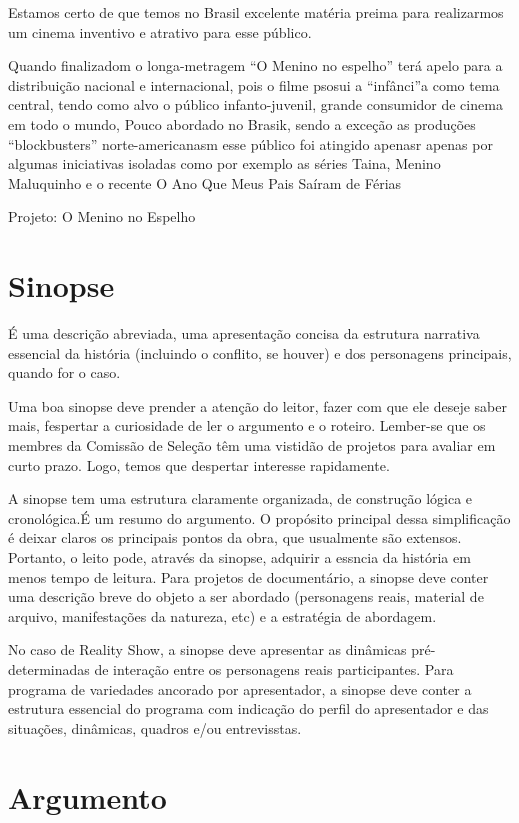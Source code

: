Estamos certo de que temos no Brasil excelente matéria preima para realizarmos um cinema inventivo e atrativo para esse público.

Quando finalizadom o longa-metragem “O Menino no espelho” terá apelo para a distribuição nacional e internacional, pois o filme psosui a “infânci”a como tema central,  tendo como alvo o público infanto-juvenil, grande consumidor de cinema em todo o mundo, Pouco abordado no Brasik, sendo a exceção as produções “blockbusters” norte-americanasm esse público foi atingido apenasr apenas   por algumas iniciativas isoladas como por exemplo as séries Taina, Menino Maluquinho e o recente O Ano Que Meus Pais Saíram de Férias

Projeto: O Menino no Espelho

\section{Sinopse}

É uma descrição abreviada, uma apresentação concisa da estrutura narrativa essencial da história (incluindo o conflito, se houver) e dos personagens principais, quando for o caso. 

Uma boa sinopse deve prender a atenção do leitor, fazer com que ele deseje saber mais, fespertar a curiosidade de ler o argumento e o roteiro. Lember-se que os membres da Comissão de Seleção têm uma vistidão de projetos para avaliar em curto prazo. Logo, temos que despertar interesse rapidamente.

A sinopse tem uma estrutura claramente organizada, de construção lógica e cronológica.É um resumo do argumento. O propósito principal dessa simplificação é deixar claros os principais pontos da obra, que usualmente são extensos. Portanto, o leito pode, através da sinopse, adquirir a essncia da história em menos tempo de leitura.
Para projetos de documentário, a sinopse deve conter uma descrição breve do objeto a ser abordado (personagens reais, material de arquivo, manifestações da natureza, etc) e a estratégia de abordagem.

No caso de Reality Show, a sinopse deve apresentar as dinâmicas pré-determinadas de interação entre os personagens reais participantes.
Para programa de variedades ancorado por apresentador, a sinopse deve conter a estrutura essencial do programa com indicação do perfil do apresentador e das situações, dinâmicas, quadros e/ou entrevisstas.
\section{Argumento}

